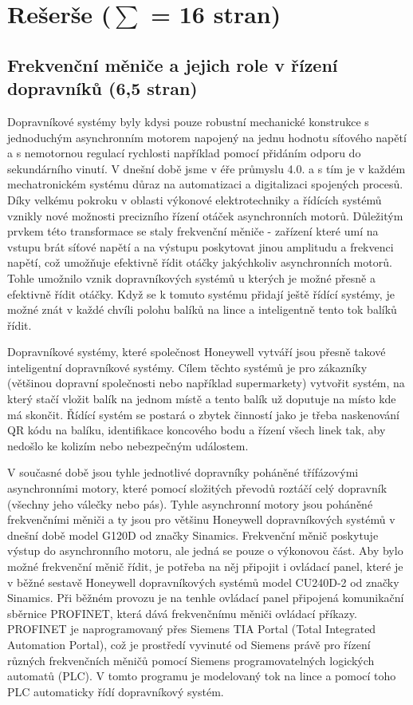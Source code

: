 \chapter{Rešerše ($\sum$ = 16 stran)} \label{chap:Rešerše}
\section{Frekvenční měniče a jejich role v řízení dopravníků (6,5 stran)}\label{sec:FrekvencniMeniceAJejichRole}

Dopravníkové systémy byly kdysi pouze robustní mechanické konstrukce s jednoduchým asynchronním motorem napojený na jednu hodnotu síťového napětí a s nemotornou regulací rychlosti například pomocí přidáním odporu do sekundárního vinutí. V dnešní době jsme v éře průmyslu 4.0. a s tím je v každém mechatronickém systému důraz na automatizaci a digitalizaci spojených procesů. Díky velkému pokroku v oblasti výkonové elektrotechniky a řídících systémů vznikly nové možnosti precizního řízení otáček asynchronních motorů. Důležitým prvkem této transformace se staly frekvenční měniče - zařízení které umí na vstupu brát síťové napětí a na výstupu poskytovat jinou amplitudu a frekvenci napětí, což umožňuje efektivně řídit otáčky jakýchkoliv asynchronních motorů. Tohle umožnilo vznik dopravníkových systémů u kterých je možné přesně a efektivně řídit otáčky. Když se k tomuto systému přidají ještě řídící systémy, je možné znát v každé chvíli polohu balíků na lince a inteligentně tento tok balíků řídit.

Dopravníkové systémy, které společnost Honeywell vytváří jsou přesně takové inteligentní dopravníkové systémy. Cílem těchto systémů je pro zákazníky (většinou dopravní společnosti nebo například supermarkety) vytvořit systém, na který stačí vložit balík na jednom místě a tento balík už doputuje na místo kde má skončit. Řídící systém se postará o zbytek činností jako je třeba naskenování QR kódu na balíku, identifikace koncového bodu a řízení všech linek tak, aby nedošlo ke kolizím nebo nebezpečným událostem.

V současné době jsou tyhle jednotlivé dopravníky poháněné třífázovými asynchronními motory, které pomocí složitých převodů roztáčí celý dopravník (všechny jeho válečky nebo pás). Tyhle asynchronní motory jsou poháněné frekvenčními měniči a ty jsou pro většinu Honeywell dopravníkových systémů v dnešní době model G120D od značky Sinamics. Frekvenční měnič poskytuje výstup do asynchronního motoru, ale jedná se pouze o výkonovou část. Aby bylo možné frekvenční měnič řídit, je potřeba na něj připojit i ovládací panel, které je v běžné sestavě Honeywell dopravníkových systémů model CU240D-2 od značky Sinamics. Při běžném provozu je na tenhle ovládací panel připojená komunikační sběrnice PROFINET, která dává frekvenčnímu měniči ovládací příkazy. PROFINET je naprogramovaný přes Siemens TIA Portal (Total Integrated Automation Portal), což je prostředí vyvinuté od Siemens právě pro řízení různých frekvenčních měničů pomocí Siemens programovatelných logických automatů (PLC). V tomto programu je modelovaný tok na lince a pomocí toho PLC automaticky řídí dopravníkový systém.
\cite{SinamicsG120D}

